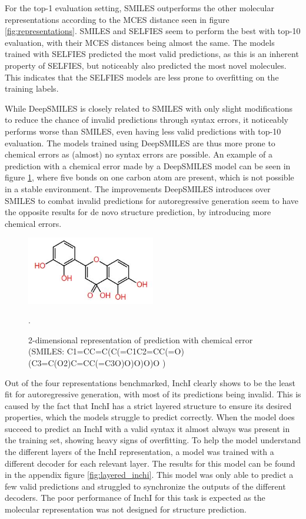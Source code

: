 For the top-1 evaluation setting, SMILES outperforms the other molecular representations according to the MCES distance seen in figure \ref{fig:representations}.
SMILES and SELFIES seem to perform the best with top-10 evaluation, with their MCES distances being almost the same.
The models trained with SELFIES predicted the most valid predictions, as this is an inherent property of SELFIES, but noticeably also predicted the most novel molecules.
This indicates that the SELFIES models are less prone to overfitting on the training labels.

While DeepSMILES is closely related to SMILES with only slight modifications to reduce the chance of invalid predictions through syntax errors, it noticeably performs worse than SMILES, even having less valid predictions with top-10 evaluation.
The models trained using DeepSMILES are thus more prone to chemical errors as (almost) no syntax errors are possible.
An example of a prediction with a chemical error made by a DeepSMILES model can be seen in figure \ref{fig:invalid_pred}, where five bonds on one carbon atom are present, which is not possible in a stable environment.
The improvements DeepSMILES introduces over SMILES to combat invalid predictions for autoregressive generation seem to have the opposite results for de novo structure prediction, by introducing more chemical errors.
\begin{figure}[h]
    \centering
    \includegraphics[width=0.5\textwidth]{figures/results/invalid_pred.JPG}
    \caption{2-dimensional representation of prediction with chemical error (SMILES: C1=CC=C(C(=C1C2=CC(=O)(C3=C(O2)C=CC(=C3O)O)O)O)O )}.
    \label{fig:invalid_pred}
\end{figure}

Out of the four representations benchmarked, InchI clearly shows to be the least fit for autoregressive generation, with most of its predictions being invalid.
This is caused by the fact that InchI has a strict layered structure to ensure its desired properties, which the models struggle to predict correctly.
When the model does succeed to predict an InchI with a valid syntax it almost always was present in the training set, showing heavy signs of overfitting.
To help the model understand the different layers of the InchI representation, a model was trained with a different decoder for each relevant layer. 
The results for this model can be found in the appendix figure \ref{fig:layered_inchi}.
This model was only able to predict a few valid predictions and struggled to synchronize the outputs of the different decoders.
The poor performance of InchI for this task is expected as the molecular representation was not designed for structure prediction.


